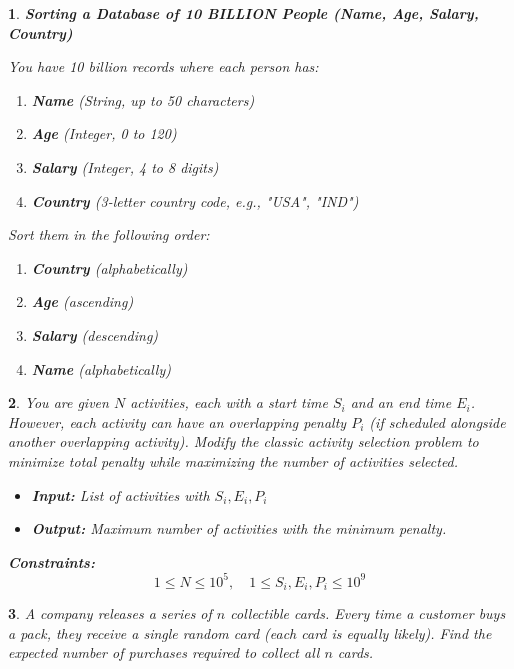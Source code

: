 \documentclass[%
addpoints]{exam}
\theoremstyle{problem}
\newtheorem{p}{}
\begin{document}
\begin{p}
\textbf{Sorting a Database of 10 BILLION People (Name, Age, Salary, Country)}

You have 10 billion records where each person has:

\begin{enumerate}
    \item \textbf{Name} (String, up to 50 characters)
    \item \textbf{Age} (Integer, 0 to 120)
    \item \textbf{Salary} (Integer, 4 to 8 digits)
    \item \textbf{Country} (3-letter country code, e.g., "USA", "IND")
\end{enumerate}

Sort them in the following order:

\begin{enumerate}
    \item[\textcircled{1}] \textbf{Country} (alphabetically)
    \item[\textcircled{2}] \textbf{Age} (ascending)
    \item[\textcircled{3}] \textbf{Salary} (descending)
    \item[\textcircled{4}] \textbf{Name} (alphabetically)
\end{enumerate}
\hfill\end{p}


\begin{p}
You are given $N$ activities, each with a start time $S_i$ and an end time $E_i$. However, each activity can have an overlapping penalty $P_i$ (if scheduled alongside another overlapping activity). Modify the classic activity selection problem to minimize total penalty while maximizing the number of activities selected.

\begin{itemize}
    \item \textbf{Input:} List of activities with $S_i, E_i, P_i$
    \item \textbf{Output:} Maximum number of activities with the minimum penalty.
\end{itemize}

\textbf{Constraints:} 
\[
1 \leq N \leq 10^5, \quad 1 \leq S_i, E_i, P_i \leq 10^9
\]
\hfill\end{p}

\begin{p}
A company releases a series of $n$ collectible cards. Every time a customer buys a pack, they receive a single random card (each card is equally likely). Find the expected number of purchases required to collect all $n$ cards.
\hfill\end{p}
\end{document}
